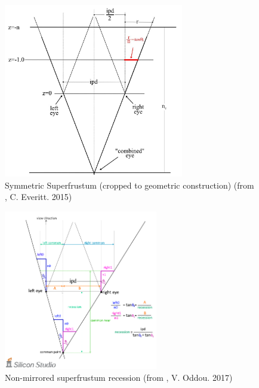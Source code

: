 \begin{figure}[htb]
  \centering
  \includegraphics[width=0.7\textwidth]{pictures/Everitt_Superfrustum_Crop}
  \caption{Symmetric Superfrustum (cropped to geometric construction) (from \cite{Everitt.2015}, C. Everitt. 2015)} \label{fig:Everitt_Superfrustum}
\end{figure}

\begin{figure}[htb]
  \centering
  \includegraphics[width=0.6\textwidth]{pictures/Oddou_Asymmetry}
  \caption{Non-mirrored superfrustum recession (from \cite{Oddou.23.05.2017}, V. Oddou. 2017)} \label{fig:Oddou_Asymmetry}
\end{figure}

